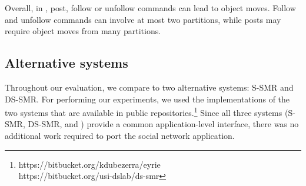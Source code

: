 Overall, in \appname, post, follow or unfollow commands can lead to
object moves.  Follow and unfollow commands can involve at most two
partitions, while posts may require object moves from many partitions.



\subsection{Alternative systems}

Throughout our evaluation, we compare \dynastar{} to two alternative
systems: S-SMR and DS-SMR. For performing our experiments, we used the
implementations of the two systems that are available in public
repositories.\footnote{https://bitbucket.org/kdubezerra/eyrie\\ \mbox{\hspace{5mm}https://bitbucket.org/usi-dslab/ds-smr}} Since
all three systems (S-SMR, DS-SMR, and \dynastar) provide a common
application-level interface, there was no additional work required to
port the social network application.

